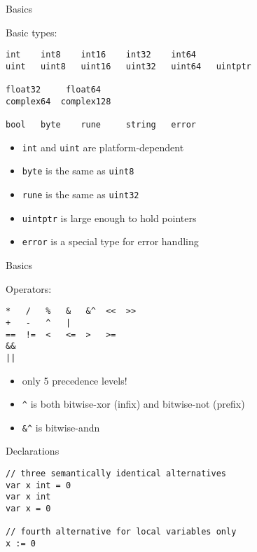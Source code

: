 \documentclass[10pt]{beamer}
\begin{document}
	\begin{frame}[t,fragile]{Basics}
		\begin{center}
			Basic types:
		\end{center}
		\begin{verbatim}
int    int8    int16    int32    int64
uint   uint8   uint16   uint32   uint64   uintptr

float32     float64
complex64  complex128

bool   byte    rune     string   error
		\end{verbatim}
		\vspace*{-4ex}
		\begin{itemize}
			\item \texttt{int} and \texttt{uint} are platform-dependent
			\item \texttt{byte} is the same as \texttt{uint8}
			\item \texttt{rune} is the same as \texttt{uint32}
			\item \texttt{uintptr} is large enough to hold pointers
			\item \texttt{error} is a special type for error handling
		\end{itemize}
\end{frame}
	
	
	\begin{frame}[t,fragile]{Basics}
		\begin{center}
			Operators:
		\end{center}
		\begin{verbatim}
*   /   %   &   &^  <<  >>
+   -   ^   |
==  !=  <   <=  >   >=
&&
||
		\end{verbatim}
		\vspace*{-4ex}
		\begin{itemize}
			\item only 5 precedence levels!
			\item \texttt{^} is both bitwise-xor (infix) and bitwise-not (prefix)
			\item \texttt{&^} is bitwise-andn
		\end{itemize}
\end{frame}
	
	
	\begin{frame}[t,fragile]{Declarations}
		\begin{verbatim}
// three semantically identical alternatives
var x int = 0
var x int
var x = 0

// fourth alternative for local variables only
x := 0
		\end{verbatim}
	\end{frame}
\end{document}
